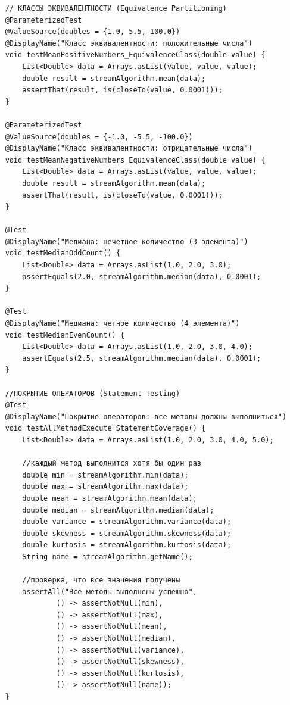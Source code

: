 \begin{verbatim}
    // КЛАССЫ ЭКВИВАЛЕНТНОСТИ (Equivalence Partitioning)
    @ParameterizedTest
    @ValueSource(doubles = {1.0, 5.5, 100.0})
    @DisplayName("Класс эквивалентности: положительные числа")
    void testMeanPositiveNumbers_EquivalenceClass(double value) {
        List<Double> data = Arrays.asList(value, value, value);
        double result = streamAlgorithm.mean(data);
        assertThat(result, is(closeTo(value, 0.0001)));
    }

    @ParameterizedTest
    @ValueSource(doubles = {-1.0, -5.5, -100.0})
    @DisplayName("Класс эквивалентности: отрицательные числа")
    void testMeanNegativeNumbers_EquivalenceClass(double value) {
        List<Double> data = Arrays.asList(value, value, value);
        double result = streamAlgorithm.mean(data);
        assertThat(result, is(closeTo(value, 0.0001)));
    }

    @Test
    @DisplayName("Медиана: нечетное количество (3 элемента)")
    void testMedianOddCount() {
        List<Double> data = Arrays.asList(1.0, 2.0, 3.0);
        assertEquals(2.0, streamAlgorithm.median(data), 0.0001);
    }

    @Test
    @DisplayName("Медиана: четное количество (4 элемента)")
    void testMedianEvenCount() {
        List<Double> data = Arrays.asList(1.0, 2.0, 3.0, 4.0);
        assertEquals(2.5, streamAlgorithm.median(data), 0.0001);
    }

    //ПОКРЫТИЕ ОПЕРАТОРОВ (Statement Testing)
    @Test
    @DisplayName("Покрытие операторов: все методы должны выполниться")
    void testAllMethodExecute_StatementCoverage() {
        List<Double> data = Arrays.asList(1.0, 2.0, 3.0, 4.0, 5.0);

        //каждый метод выполнится хотя бы один раз
        double min = streamAlgorithm.min(data);
        double max = streamAlgorithm.max(data);
        double mean = streamAlgorithm.mean(data);
        double median = streamAlgorithm.median(data);
        double variance = streamAlgorithm.variance(data);
        double skewness = streamAlgorithm.skewness(data);
        double kurtosis = streamAlgorithm.kurtosis(data);
        String name = streamAlgorithm.getName();

        //проверка, что все значения получены
        assertAll("Все методы выполнены успешно",
                () -> assertNotNull(min),
                () -> assertNotNull(max),
                () -> assertNotNull(mean),
                () -> assertNotNull(median),
                () -> assertNotNull(variance),
                () -> assertNotNull(skewness),
                () -> assertNotNull(kurtosis),
                () -> assertNotNull(name));
    }


\end{verbatim}
